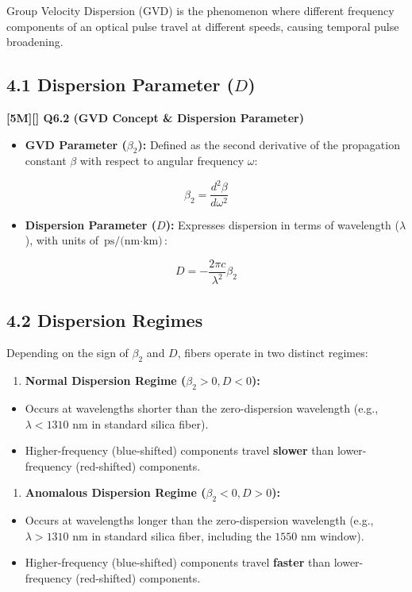 Group Velocity Dispersion (GVD) is the phenomenon where different frequency components of an optical pulse travel at different speeds, causing temporal pulse broadening.

\subsection{4.1 Dispersion Parameter ($D$)}
\textbf{[5M][] Q6.2 (GVD Concept \& Dispersion Parameter)}

\begin{itemize}
  \item   \textbf{GVD Parameter ($\beta_2$):} Defined as the second derivative of the propagation constant $\beta$ with respect to angular frequency $\omega$:
\end{itemize}
    \[ \beta_2 = \frac{d^2\beta}{d\omega^2} \]
\begin{itemize}
  \item   \textbf{Dispersion Parameter ($D$):} Expresses dispersion in terms of wavelength ($\lambda$), with units of $\text{ps/(nm} \cdot \text{km)}$:
\end{itemize}
    \[ D = -\frac{2\pi c}{\lambda^2} \beta_2 \]


\subsection{4.2 Dispersion Regimes}
Depending on the sign of $\beta_2$ and $D$, fibers operate in two distinct regimes:

\begin{enumerate}
  \item \textbf{Normal Dispersion Regime ($\beta_2 > 0, D < 0$):}
\end{enumerate}
\begin{itemize}
  \item   Occurs at wavelengths shorter than the zero-dispersion wavelength (e.g., $\lambda < 1310\text{ nm}$ in standard silica fiber).
  \item   Higher-frequency (blue-shifted) components travel \textbf{slower} than lower-frequency (red-shifted) components.
\end{itemize}
\begin{enumerate}
  \item \textbf{Anomalous Dispersion Regime ($\beta_2 < 0, D > 0$):}
\end{enumerate}
\begin{itemize}
  \item   Occurs at wavelengths longer than the zero-dispersion wavelength (e.g., $\lambda > 1310\text{ nm}$ in standard silica fiber, including the $1550\text{ nm}$ window).
  \item   Higher-frequency (blue-shifted) components travel \textbf{faster} than lower-frequency (red-shifted) components.
\end{itemize}


